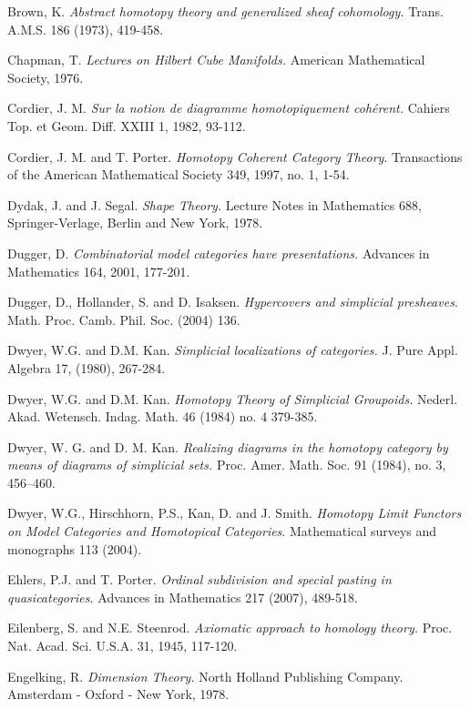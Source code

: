 \documentclass{report}[10pt, final]
\theoremstyle{definition}
\begin{document}
\begin{EndMatter}
\begin{thebibliography}{99}
 Brown, K. {\it Abstract homotopy theory and generalized sheaf cohomology.} Trans. 
A.M.S. 186 (1973), 419-458. 

 Chapman, T. {\it Lectures on Hilbert Cube Manifolds.} American Mathematical Society, 1976.

 Cordier, J. M. {\it Sur la notion de diagramme homotopiquement coh\'{e}rent.} Cahiers Top. et Geom. Diff. XXIII 1, 1982, 93-112.

 Cordier, J. M. and T. Porter.
{\it Homotopy Coherent Category Theory}. Transactions of the American
Mathematical Society 349, 1997, no. 1, 1-54.

 Dydak, J. and J. Segal. {\it Shape Theory.} Lecture Notes in Mathematics 688, Springer-Verlage, Berlin and New York, 1978.

 Dugger, D. {\it Combinatorial model categories have presentations.} Advances in Mathematics 164, 2001, 177-201.

 Dugger, D., Hollander, S. and D. Isaksen. {\it
Hypercovers and simplicial presheaves}. Math. Proc. Camb. Phil. Soc. (2004) 136. 

 Dwyer, W.G. and D.M. Kan. {\it Simplicial localizations
of categories.} J. Pure Appl. Algebra 17, (1980), 267-284.

 Dwyer, W.G. and D.M. Kan. {\it Homotopy Theory of
Simplicial Groupoids.} Nederl. Akad. Wetensch. Indag. Math. 46
(1984) no. 4 379-385.

 Dwyer, W. G. and D. M. Kan. {\it Realizing diagrams in the homotopy category by means of diagrams of simplicial sets.} Proc. Amer. Math. Soc. 91 (1984), no. 3, 456--460.

 Dwyer, W.G., Hirschhorn, P.S., Kan, D. and J. Smith. {\it Homotopy Limit Functors on Model Categories and Homotopical Categories}. Mathematical surveys and monographs 113 (2004).

 Ehlers, P.J. and T. Porter. {\it Ordinal subdivision and special pasting in quasicategories.} Advances in Mathematics 217 (2007), 489-518.

 Eilenberg, S. and N.E. Steenrod. {\it Axiomatic approach to homology theory.} Proc. Nat. Acad. Sci. U.S.A. 31, 1945, 117-120.

 Engelking, R. {\it Dimension Theory.} North Holland Publishing Company. Amsterdam - Oxford - New York, 1978. 


\end{thebibliography}
\end{EndMatter}
\end{document}
